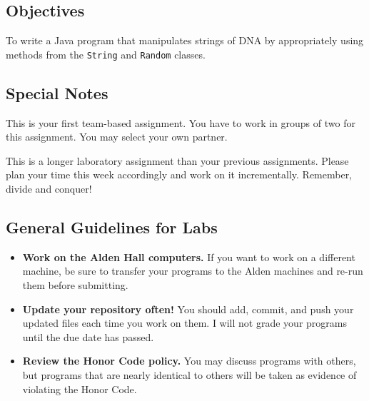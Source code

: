 


\subsection*{Objectives}
\vspace{-0.05in}
To write a Java program that manipulates strings of DNA by appropriately using methods from the {\tt String} and {\tt Random} classes.

\vspace{-0.05in}
\subsection*{Special Notes}
\vspace{-0.05in}

This is your first team-based assignment. You have to work in groups of two for this assignment. You may select your own partner.

\noindent This is a longer laboratory assignment than your previous assignments. Please plan your time this week accordingly and work on it incrementally. Remember, divide and conquer!

\vspace{-0.05in}
\subsection*{General Guidelines for Labs}
\vspace{-0.05in}
\begin{itemize}
\item
{\bf Work on the Alden Hall computers.} If you want to work on a different
machine, be sure to transfer your programs to the Alden
machines and re-run them before submitting.
\item
{\bf Update your repository often!} You should add, commit,
and push your updated files each time you work on them.  I will not grade
your programs until the due date has passed.
\item
{\bf Review the Honor Code policy.} You
may discuss programs with others, but programs that are nearly identical
to others will be taken as evidence of violating the Honor Code.
\end{itemize}

\vspace{-0.05in}
